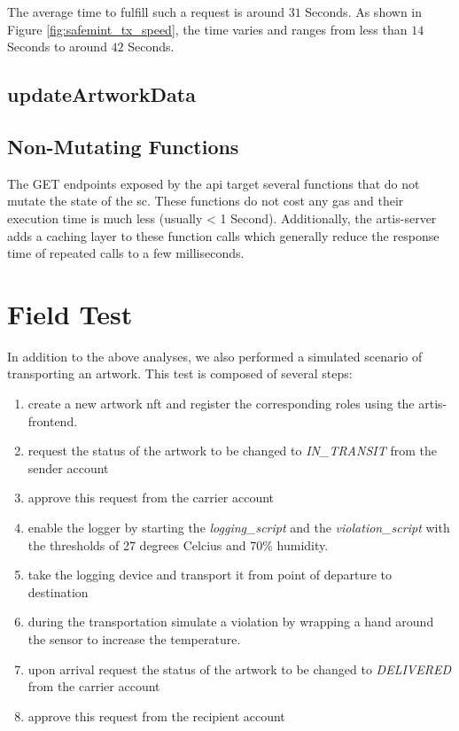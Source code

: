The average time to fulfill such a request is around $31$ Seconds. As shown in Figure \ref{fig:safemint_tx_speed}, the time varies and ranges from less than $14$ Seconds to around $42$ Seconds.

\subsection*{updateArtworkData}

\subsection*{Non-Mutating Functions}
The GET endpoints exposed by the \gls{api} target several functions that do not mutate the state of the \gls{sc}. These functions do not cost any gas and their execution time is much less (usually < 1 Second). Additionally, the artis-server adds a caching layer to these function calls which generally reduce the response time of repeated calls to a few milliseconds. 

\section{Field Test}
In addition to the above analyses, we also performed a simulated scenario of transporting an artwork. This test is composed of several steps:

\begin{enumerate}
    \item create a new artwork \gls{nft} and register the corresponding roles using the artis-frontend.
    \item request the status of the artwork to be changed to \textit{IN\_TRANSIT} from the sender account
    \item approve this request from the carrier account
    \item enable the logger by starting the \textit{logging\_script} and the \textit{violation\_script} with the thresholds of 27 degrees Celcius and 70\% humidity.
    \item take the logging device and transport it from point of departure to destination
    \item during the transportation simulate a violation by wrapping a hand around the sensor to increase the temperature.
    \item upon arrival request the status of the artwork to be changed to \textit{DELIVERED} from the carrier account
    \item approve this request from the recipient account
\end{enumerate}

